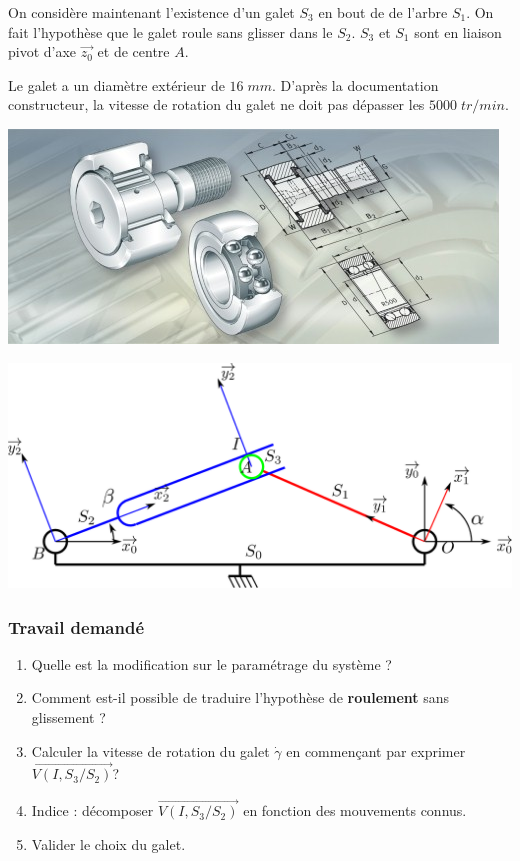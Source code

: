 \begin{minipage}[c]{.4\linewidth}
On considère maintenant l'existence d'un galet $S_3$ en bout de de l'arbre $S_1$. On fait l'hypothèse que le galet roule sans glisser dans le $S_2$. $S_3$ et $S_1$ sont en liaison pivot d'axe $\overrightarrow{z_0}$ et de centre $A$.

Le galet a un diamètre extérieur de $16\;mm$. D'après la documentation constructeur, la vitesse de rotation du galet ne doit pas dépasser les $5000\; tr/min$.
\end{minipage} \hfill
\begin{minipage}[c]{.55\linewidth}
\begin{center}
 \includegraphics[width=\textwidth]{png/galet}
\end{center}
\end{minipage}

\begin{center}
 \includegraphics[width=.9\textwidth]{png/schema2}
\end{center}

\subsubsection{Travail demandé}

\begin{enumerate}
\item Quelle est la modification sur le paramétrage du système ?
\item Comment est-il possible de traduire l'hypothèse de \textbf{roulement} sans glissement ?
\item Calculer la vitesse de rotation du galet $\dot{\gamma}$ en commençant par exprimer $\overrightarrow{V(I,S_3/S_2)}$?
\item Indice : décomposer $\overrightarrow{V(I,S_3/S_2)}$ en fonction des mouvements connus.
\item Valider le choix du galet.
\end{enumerate}

